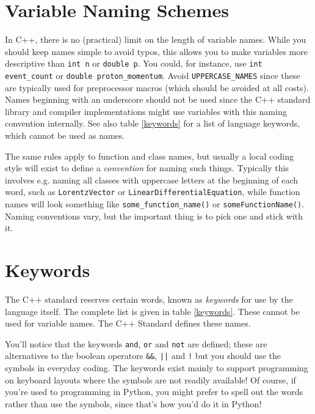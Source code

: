 \documentclass[a4paper]{scrartcl}
\begin{document}
\section{Variable Naming Schemes}
In C++, there is no (practical) limit on the length of variable names. While you should keep names simple to avoid typos, this allows you to make variables more descriptive than \texttt{int n} or \texttt{double p}. You could, for instance, use \texttt{int event\_count} or \texttt{double proton\_momentum}. Avoid \texttt{UPPERCASE\_NAMES} since these are typically used for preprocessor macros (which should be avoided at all costs). Names beginning with an underscore should not be used since the C++ standard library and compiler implementations might use variables with this naming convention internally. See also table \ref{keywords} for a list of language keywords, which cannot be used as names.

The same rules apply to function and class names, but usually a local coding style will exist to define a \emph{convention} for naming such things. Typically this involves e.g. naming all classes with uppercase letters at the beginning of each word, such as \texttt{LorentzVector} or \texttt{LinearDifferentialEquation}, while function names will look something like \texttt{some\_function\_name()} or \texttt{someFunctionName()}. Naming conventions vary, but the important thing is to pick one and stick with it.

\section{Keywords}
The C++ standard reserves certain words, known as \emph{keywords} for use by the language itself. The complete list is given in table \ref{keywords}. These cannot be used for variable names. The C++ Standard\cite{C++Standard} defines these names.

You'll notice that the keywords \texttt{and}, \texttt{or} and \texttt{not} are defined; these are alternatives to the boolean operators \texttt{\&\&}, \texttt{||} and \texttt{!} but you should use the symbols in everyday coding. The keywords exist mainly to support programming on keyboard layouts where the symbols are not readily available! Of course, if you're used to programming in Python, you might prefer to spell out the words rather than use the symbols, since that's how you'd do it in Python!
\end{document}
